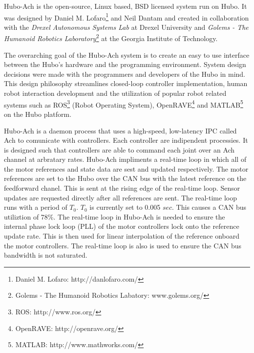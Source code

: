 Hubo-Ach is the open-source, Linux based, BSD licensed system run on Hubo.  
It was designed by Daniel M. Lofaro\footnote{Daniel M. Lofaro: http://danlofaro.com/} and Neil Dantam  and created in collaboration with the \textit{Drexel Autonomous Systems Lab} at Drexel University and \textit{Golems - The Humanoid Robotics Laboratory}\footnote{Golems - The Humanoid Robotics Labatory: www.golems.org/} at the Georgia Institute of Technology.  

The overarching goal of the Hubo-Ach system is to create an easy to use interface between the Hubo's hardware and the programming environment.  
System design decisions were made with the programmers and developers of the Hubo in mind.
This design philosophy streamlines closed-loop controller implementation, human robot interaction development and the utilization of popular robot related systems such as ROS\footnote{ROS: http://www.ros.org/} (Robot Operating System), OpenRAVE\footnote{OpenRAVE: http://openrave.org/} and MATLAB\footnote{MATLAB: http://www.mathworks.com/} on the Hubo platform.

Hubo-Ach is a daemon process that uses a high-speed, low-latency IPC called Ach \cite{ach} to comunicate with controllers.
Each controller are indipendent processies.
It is designed such that controllers are able to command each joint over an Ach channel at arbratary rates.
Hubo-Ach impliments a real-time loop in which all of the motor references and state data are sest and updated respectively.
The motor references are set to the Hubo over the CAN bus with the latest reference on the feedforward chanel.
This is sent at the rising edge of the real-time loop.
Sensor updates are requested directly after all references are sent.
The real-time loop runs with a period of $T_0$.
$T_0$ is currently set to 0.005 $sec$.
This causes a CAN bus utiliztion of 78\%.
The real-time loop in Hubo-Ach is needed to ensure the internal phase lock loop (PLL) of the motor controllers lock onto the reference update rate.
This is then used for linear interpolation of the reference onboard the motor controllers.
The real-time loop is also is used to ensure the CAN bus bandwidth is not saturated.



